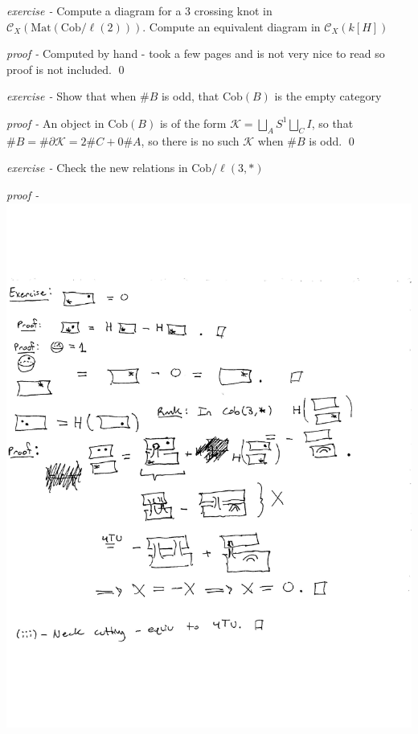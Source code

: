 \documentclass[11pt]{article}
\theoremstyle{definition}
\begin{document}
    \emph{exercise - } Compute a diagram for a 3 crossing knot in \(\mathcal{C}_X(\text{Mat}(\text{Cob}/\ell(2)))\). Compute an equivalent diagram in \(\mathcal{C}_X(k[H])\)

    \emph{proof - } Computed by hand - took a few pages and is not very nice to read so proof is not included. \qed



    \emph{exercise - } Show that when \(\#B\) is odd, that \(\text{Cob}(B)\) is the empty category

    \emph{proof - } An object in \(\text{Cob}(B)\) is of the form \(\mathcal{K} = \bigsqcup_A S^1 \bigsqcup_C I\), so that \(\# B = \# \partial \mathcal{K} = 2 \# C + 0\#A\), so there is no such \(\mathcal{K}\) when \(\# B\) is odd. \qed




    \emph{exercise - } Check the new relations in \(\text{Cob}/\ell(3,*)\)

    \emph{proof - } \includegraphics[width=\linewidth]{additional pdfs/new relations in Cob:l(4).pdf}
\end{document}

